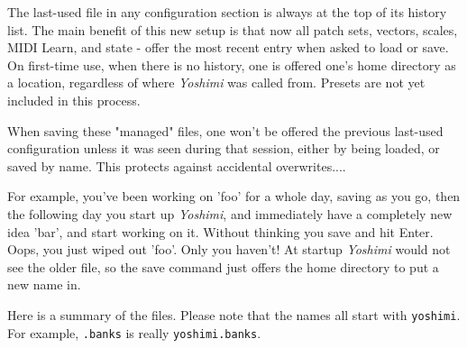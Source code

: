    The last-used file in any configuration section is always at the top of its
   history list.  The main benefit of this new setup is that now all patch
   sets, vectors, scales, MIDI Learn, and state - offer the most recent entry
   when asked to load or save. On first-time use, when there is no history, one
   is offered one's home directory as a location, regardless of where
   \textsl{Yoshimi} was called from.  Presets are not yet included in this
   process.

   When saving these "managed" files, one won't be offered the previous
   last-used configuration unless it was seen during that session, either by
   being loaded, or saved by name.  This protects against accidental
   overwrites....

   For example, you've been working on 'foo' for a whole day, saving as you go,
   then the following day you start up \textsl{Yoshimi}, and immediately have
   a completely new idea 'bar', and start working on it. Without thinking you
   save and hit Enter. Oops, you just wiped out 'foo'. Only you haven't!
   At startup \textsl{Yoshimi} would not see the older file,
   so the save command just offers the home directory to put a new name in.

   Here is a summary of the files.  Please note that the names all start with
   \texttt{yoshimi}.  For example, \texttt{.banks} is really
   \texttt{yoshimi.banks}.

